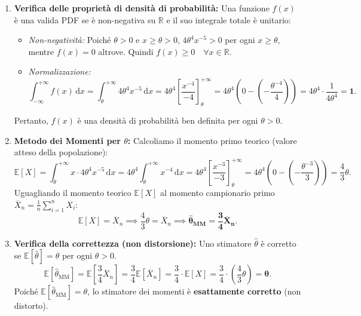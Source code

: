 \documentclass[11pt,a4paper]{article}
\newcommand{\EE}{\mathbb{E}}
\newcommand{\dx}{\mathrm{d}x}
\begin{document}
\begin{soluzionebox}
\begin{enumerate}[label=(\roman*)]
    \item \textbf{Verifica delle proprietà di densità di probabilità:}
    Una funzione $f(x)$ è una valida PDF se è non-negativa su $\mathbb{R}$ e il suo integrale totale è unitario:
    \begin{itemize}
        \item \emph{Non-negatività:} Poiché $\theta > 0$ e $x \ge \theta > 0$, $4\theta^4 x^{-5} > 0$ per ogni $x \ge \theta$, mentre $f(x)=0$ altrove. Quindi $f(x) \ge 0 \quad \forall x \in \mathbb{R}$.
        \item \emph{Normalizzazione:}
        \[
        \int_{-\infty}^{+\infty} f(x) \, \dx = \int_{\theta}^{+\infty} 4\theta^4 x^{-5} \, \dx = 4\theta^4 \left[ \frac{x^{-4}}{-4} \right]_{\theta}^{+\infty} = 4\theta^4 \left( 0 - \left(-\frac{\theta^{-4}}{4}\right) \right) = 4\theta^4 \cdot \frac{1}{4\theta^4} = \bm{1}.
        \]
    \end{itemize}
    Pertanto, $f(x)$ è una densità di probabilità ben definita per ogni $\theta > 0$.

    \item \textbf{Metodo dei Momenti per $\theta$:}
    Calcoliamo il momento primo teorico (valore atteso della popolazione):
    \[
    \EE[X] = \int_{\theta}^{+\infty} x \cdot 4\theta^4 x^{-5} \, \dx = 4\theta^4 \int_{\theta}^{+\infty} x^{-4} \, \dx = 4\theta^4 \left[ \frac{x^{-3}}{-3} \right]_{\theta}^{+\infty} = 4\theta^4 \left( 0 - \left(-\frac{\theta^{-3}}{3}\right) \right) = \frac{4}{3}\theta.
    \]
    Uguagliando il momento teorico $\EE[X]$ al momento campionario primo $\overline{X}_n = \frac{1}{n}\sum_{i=1}^n X_i$:
    \[
    \EE[X] = \overline{X}_n \implies \frac{4}{3}\theta = \overline{X}_n \implies \bm{\widehat{\theta}_{\text{MM}} = \frac{3}{4}\overline{X}_n}.
    \]

    \item \textbf{Verifica della correttezza (non distorsione):}
    Uno stimatore $\widehat{\theta}$ è corretto se $\EE[\widehat{\theta}] = \theta$ per ogni $\theta > 0$.
    \[
    \EE[\widehat{\theta}_{\text{MM}}] = \EE\left[ \frac{3}{4}\overline{X}_n \right] = \frac{3}{4}\EE[\overline{X}_n] = \frac{3}{4} \cdot \EE[X] = \frac{3}{4} \cdot \left(\frac{4}{3}\theta\right) = \bm{\theta}.
    \]
    Poiché $\EE[\widehat{\theta}_{\text{MM}}] = \theta$, lo stimatore dei momenti è \textbf{esattamente corretto} (non distorto).


\end{enumerate}
\end{soluzionebox}
\end{document}
